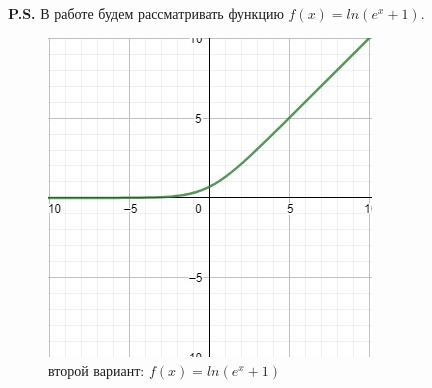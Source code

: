 \documentclass{article}
\begin{document}
	\null\newpage
	\textbf{P.S.}
	В работе будем рассматривать функцию $f(x) = ln(e^x + 1)$.
	\begin{figure}[h]
		\centering
		\includegraphics[width=0.5\linewidth]{assets/plot_task_2.jpg}
		\caption{второй вариант: $f(x) = ln(e^x + 1)$}
		\label{fig:mpr}
	\end{figure}
	\null\newpage
\end{document}
